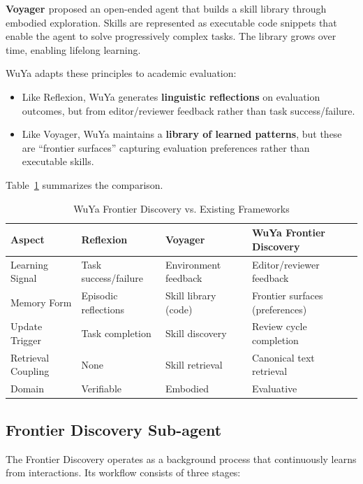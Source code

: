 \textbf{Voyager \citep{wang2023voyager}} proposed an open-ended agent that builds a skill library through embodied exploration. Skills are represented as executable code snippets that enable the agent to solve progressively complex tasks. The library grows over time, enabling lifelong learning.

WuYa adapts these principles to academic evaluation:

\begin{itemize}
    \item Like Reflexion, WuYa generates \textbf{linguistic reflections} on evaluation outcomes, but from editor/reviewer feedback rather than task success/failure.
    \item Like Voyager, WuYa maintains a \textbf{library of learned patterns}, but these are ``frontier surfaces'' capturing evaluation preferences rather than executable skills.
\end{itemize}

Table~\ref{tab:frontier-comparison} summarizes the comparison.

\begin{table}[t]
\centering
\caption{WuYa Frontier Discovery vs. Existing Frameworks}
\label{tab:frontier-comparison}
\begin{tabular}{@{}llll@{}}
\toprule
\textbf{Aspect} & \textbf{Reflexion} & \textbf{Voyager} & \textbf{WuYa Frontier Discovery} \\
\midrule
Learning Signal & Task success/failure & Environment feedback & Editor/reviewer feedback \\
Memory Form & Episodic reflections & Skill library (code) & Frontier surfaces (preferences) \\
Update Trigger & Task completion & Skill discovery & Review cycle completion \\
Retrieval Coupling & None & Skill retrieval & Canonical text retrieval \\
Domain & Verifiable & Embodied & Evaluative \\
\bottomrule
\end{tabular}
\end{table}

\subsection{Frontier Discovery Sub-agent}

The Frontier Discovery \subagent{} operates as a background process that continuously learns from interactions. Its workflow consists of three stages:

